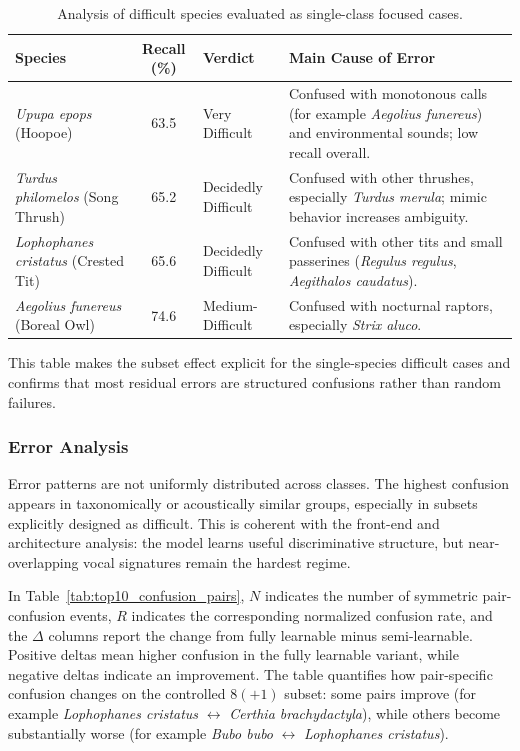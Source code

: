\documentclass[a4paper,singleside,12pt]{report} %
\begin{document}
	\begin{table}[H]
		\centering
		\scriptsize
		\renewcommand{\arraystretch}{1.15}
		\setlength{\tabcolsep}{6pt}
		\caption{Analysis of difficult species evaluated as single-class focused cases.}
		\label{tab:difficult_species_single}
		\begin{tabular}{|p{3.3cm}|c|p{2.9cm}|p{6.2cm}|}
			\hline
			Species & Recall (\%) & Verdict & Main Cause of Error \\
			\hline
			\emph{Upupa epops} (Hoopoe) & 63.5 & Very Difficult & Confused with monotonous calls (for example \emph{Aegolius funereus}) and environmental sounds; low recall overall. \\
			\hline
			\emph{Turdus philomelos} (Song Thrush) & 65.2 & Decidedly Difficult & Confused with other thrushes, especially \emph{Turdus merula}; mimic behavior increases ambiguity. \\
			\hline
			\emph{Lophophanes cristatus} (Crested Tit) & 65.6 & Decidedly Difficult & Confused with other tits and small passerines (\emph{Regulus regulus}, \emph{Aegithalos caudatus}). \\
			\hline
			\emph{Aegolius funereus} (Boreal Owl) & 74.6 & Medium-Difficult & Confused with nocturnal raptors, especially \emph{Strix aluco}. \\
			\hline
		\end{tabular}
	\end{table}


	This table makes the subset effect explicit for the single-species difficult cases and confirms that most residual errors are structured confusions rather than random failures.
	\subsubsection{Error Analysis}
	Error patterns are not uniformly distributed across classes. The highest confusion appears in taxonomically or acoustically similar groups, especially in subsets explicitly designed as difficult. This is coherent with the front-end and architecture analysis: the model learns useful discriminative structure, but near-overlapping vocal signatures remain the hardest regime.

	
	In Table~\ref{tab:top10_confusion_pairs}, \(N\) indicates the number of symmetric pair-confusion events, \(R\) indicates the corresponding normalized confusion rate, and the \(\Delta\) columns report the change from fully learnable minus semi-learnable. Positive deltas mean higher confusion in the fully learnable variant, while negative deltas indicate an improvement. The table quantifies how pair-specific confusion changes on the controlled \(8(+1)\) subset: some pairs improve (for example \emph{Lophophanes cristatus} \(\leftrightarrow\) \emph{Certhia brachydactyla}), while others become substantially worse (for example \emph{Bubo bubo} \(\leftrightarrow\) \emph{Lophophanes cristatus}).
\end{document}
